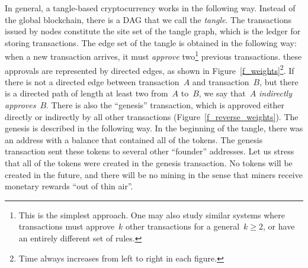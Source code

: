 \documentclass[12pt]{article}
\begin{document}

In general, 
a tangle-based cryptocurrency works in the following way. 
Instead of the global blockchain, there is a DAG 
that we call the \emph{tangle}. 
The transactions issued by nodes constitute the site set of the tangle graph,
which is the ledger for storing transactions.
The edge set of the tangle is obtained in the following way: when a new transaction 
arrives, it must \emph{approve} 
two\footnote{This is the simplest approach. One may also study
similar systems where transactions must approve~$k$ other transactions
for a general~$k\geq 2$, or 
have an entirely different set of rules.}
 previous transactions. these approvals 
are represented by directed edges, as shown in
Figure~\ref{f_weights}\footnote{Time always increases from left to right in each figure.}.
If there is 
not a directed edge between transaction~$A$ 
and transaction~$B$, but there is
a directed path of length at least two from~$A$ 
to~$B$, we say that~$A$ \emph{indirectly approves}~$B$.  
There is also the ``genesis'' 
transaction, which
is approved either directly or indirectly
by all other
transactions (Figure~\ref{f_reverse_weights}).
The genesis is described in the following way.
In the beginning of the tangle, there was an address with a balance 
that contained all of the tokens. 
The genesis transaction 
sent these tokens to several other ``founder'' addresses. 
Let us stress that all of the tokens were created in the genesis transaction.
No tokens will be created in the future, and there will be no mining
in the sense that miners receive monetary rewards ``out of thin air''.
\end{document}
